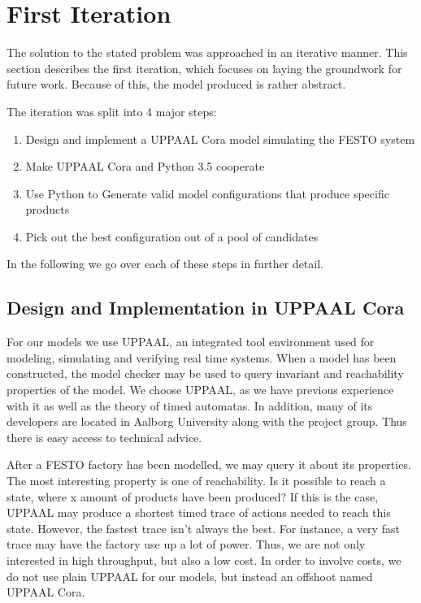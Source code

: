 \chapter{First Iteration}
\label{ch:firstiteration}
The solution to the stated problem was approached in an iterative manner. This section describes the first iteration, which focuses on laying the groundwork for future work. Because of this, the model produced is rather abstract.

The iteration was split into 4 major steps:

\begin{enumerate}
\item Design and implement a UPPAAL Cora model simulating the FESTO system
\item Make UPPAAL Cora and Python 3.5 cooperate
\item Use Python to Generate valid model configurations that  produce specific products
\item Pick out the best configuration out of a pool of candidates
\end{enumerate}

In the following we go over each of these steps in further detail.

\section{Design and Implementation in UPPAAL Cora}
For our models we use UPPAAL, an integrated tool environment used for modeling, simulating and verifying real time systems. When a model has been constructed, the model checker may be used to query invariant and reachability properties of the model.  We choose UPPAAL, as we have previous experience with it as well as the theory of timed automatas. In addition, many of its developers are located in Aalborg University along with the project group. Thus there is easy access to technical advice.  

After a FESTO factory has been modelled, we may query it about its properties. The most interesting property is one of reachability. Is it possible to reach a state, where  x amount of products have been produced? If this is the case, UPPAAL may produce a shortest timed trace of actions needed to reach this state.  However, the fastest trace isn’t always the best. For instance, a very fast trace may have the factory use up a lot of power. Thus, we are not only interested in high throughput, but also a low cost. In order to involve costs, we do not use plain UPPAAL for our models, but instead an offshoot named UPPAAL Cora. 

